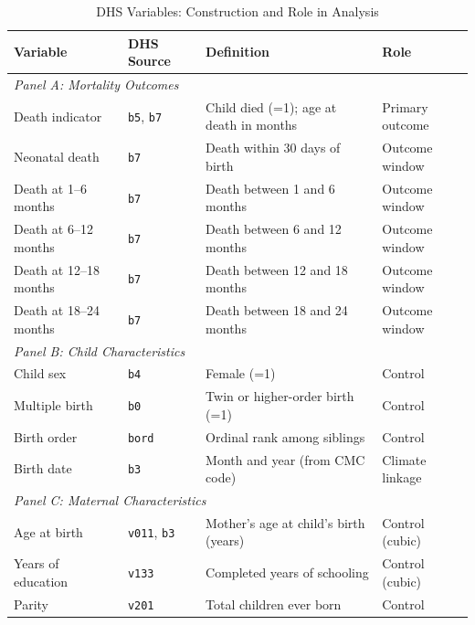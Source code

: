  
\begin{table}[htbp]
\centering
\caption{DHS Variables: Construction and Role in Analysis}
\label{tab:dhs_variables}
\small
\begin{tabular}{llll}
\hline\hline
\textbf{Variable} & \textbf{DHS Source} & \textbf{Definition} & \textbf{Role} \\
\hline
\multicolumn{4}{l}{\textit{Panel A: Mortality Outcomes}} \\[4pt]
Death indicator       & \texttt{b5}, \texttt{b7} & Child died (=1); age at death in months & Primary outcome \\
Neonatal death        & \texttt{b7} & Death within 30 days of birth & Outcome window \\
Death at 1--6 months  & \texttt{b7} & Death between 1 and 6 months & Outcome window \\
Death at 6--12 months & \texttt{b7} & Death between 6 and 12 months & Outcome window \\
Death at 12--18 months& \texttt{b7} & Death between 12 and 18 months & Outcome window \\
Death at 18--24 months& \texttt{b7} & Death between 18 and 24 months & Outcome window \\
[6pt]
\multicolumn{4}{l}{\textit{Panel B: Child Characteristics}} \\[4pt]
Child sex             & \texttt{b4}   & Female (=1)                         & Control \\
Multiple birth        & \texttt{b0}   & Twin or higher-order birth (=1)     & Control \\
Birth order           & \texttt{bord} & Ordinal rank among siblings         & Control \\
Birth date            & \texttt{b3}   & Month and year (from CMC code)      & Climate linkage \\
[6pt]
\multicolumn{4}{l}{\textit{Panel C: Maternal Characteristics}} \\[4pt]
Age at birth          & \texttt{v011}, \texttt{b3} & Mother's age at child's birth (years) & Control (cubic) \\
Years of education    & \texttt{v133} & Completed years of schooling        & Control (cubic) \\
Parity                & \texttt{v201} & Total children ever born            & Control \\

\end{tabular}
\end{table}
